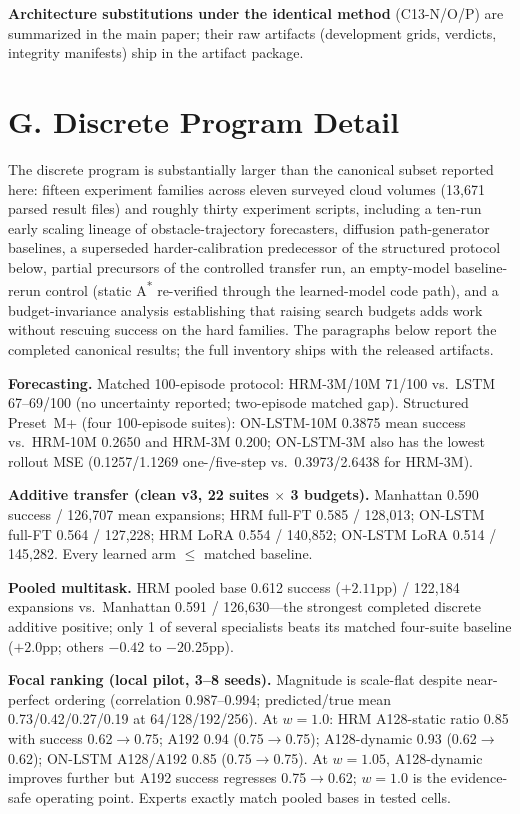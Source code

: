 \documentclass[letterpaper]{article} %
\newcommand{\stage}[1]{\textsc{#1}}
\begin{document}
\textbf{Architecture substitutions under the identical method} (\stage{C13-N/O/P}) are summarized in the main paper; their raw artifacts (development grids, verdicts, integrity manifests) ship in the artifact package.

\section{G. Discrete Program Detail}

The discrete program is substantially larger than the canonical subset reported here: fifteen experiment families across eleven surveyed cloud volumes (13{,}671 parsed result files) and roughly thirty experiment scripts, including a ten-run early scaling lineage of obstacle-trajectory forecasters, diffusion path-generator baselines, a superseded harder-calibration predecessor of the structured protocol below, partial precursors of the controlled transfer run, an empty-model baseline-rerun control (static A\textsuperscript{*} re-verified through the learned-model code path), and a budget-invariance analysis establishing that raising search budgets adds work without rescuing success on the hard families. The paragraphs below report the completed canonical results; the full inventory ships with the released artifacts.

\textbf{Forecasting.} Matched 100-episode protocol: HRM-3M/10M 71/100 vs.\ LSTM 67--69/100 (no uncertainty reported; two-episode matched gap). Structured Preset~M+ (four 100-episode suites): ON-LSTM-10M 0.3875 mean success vs.\ HRM-10M 0.2650 and HRM-3M 0.200; ON-LSTM-3M also has the lowest rollout MSE (0.1257/1.1269 one-/five-step vs.\ 0.3973/2.6438 for HRM-3M).

\textbf{Additive transfer (clean v3, 22 suites $\times$ 3 budgets).} Manhattan 0.590 success / 126{,}707 mean expansions; HRM full-FT 0.585 / 128{,}013; ON-LSTM full-FT 0.564 / 127{,}228; HRM LoRA 0.554 / 140{,}852; ON-LSTM LoRA 0.514 / 145{,}282. Every learned arm $\leq$ matched baseline.

\textbf{Pooled multitask.} HRM pooled base 0.612 success ($+2.11$pp) / 122{,}184 expansions vs.\ Manhattan 0.591 / 126{,}630---the strongest completed discrete additive positive; only 1 of several specialists beats its matched four-suite baseline ($+2.0$pp; others $-0.42$ to $-20.25$pp).

\textbf{Focal ranking (local pilot, 3--8 seeds).} Magnitude is scale-flat despite near-perfect ordering (correlation 0.987--0.994; predicted/true mean 0.73/0.42/0.27/0.19 at 64/128/192/256). At $w{=}1.0$: HRM A128-static ratio 0.85 with success 0.62$\to$0.75; A192 0.94 (0.75$\to$0.75); A128-dynamic 0.93 (0.62$\to$0.62); ON-LSTM A128/A192 0.85 (0.75$\to$0.75). At $w{=}1.05$, A128-dynamic improves further but A192 success regresses 0.75$\to$0.62; $w{=}1.0$ is the evidence-safe operating point. Experts exactly match pooled bases in tested cells.
\end{document}

